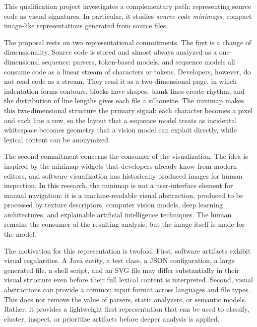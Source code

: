 This qualification project investigates a complementary path: representing
source code as visual signatures. In particular, it studies \textit{source code
minimaps}, compact image-like representations generated from source files.

The proposal rests on two representational commitments. The first is a change
of dimensionality. Source code is stored and almost always analyzed as a
one-dimensional sequence: parsers, token-based models, and sequence models all
consume code as a linear stream of characters or tokens. Developers, however,
do not read code as a stream. They read it as a two-dimensional page, in which
indentation forms contours, blocks have shapes, blank lines create rhythm, and
the distribution of line lengths gives each file a silhouette. The minimap
makes this two-dimensional structure the primary signal: each character becomes
a pixel and each line a row, so the layout that a sequence model treats as
incidental whitespace becomes geometry that a vision model can exploit
directly, while lexical content can be anonymized.

The second commitment concerns the consumer of the visualization. The idea is
inspired by the minimap widgets that developers already know from modern
editors, and software visualization has historically produced images for human
inspection. In this research, the minimap is not a user-interface element for
manual navigation: it is a machine-readable visual abstraction, produced to be
processed by texture descriptors, computer vision models, deep learning
architectures, and explainable artificial intelligence techniques. The human
remains the consumer of the resulting analysis, but the image itself is made
for the model.

The motivation for this representation is twofold. First, software artifacts
exhibit visual regularities. A Java entity, a test class, a JSON configuration, a
large generated file, a shell script, and an SVG file may differ substantially in
their visual structure even before their full lexical content is interpreted.
Second, visual abstractions can provide a common input format across languages
and file types. This does not remove the value of parsers, static analyzers, or
semantic models. Rather, it provides a lightweight first representation that can
be used to classify, cluster, inspect, or prioritize artifacts before deeper
analysis is applied.

